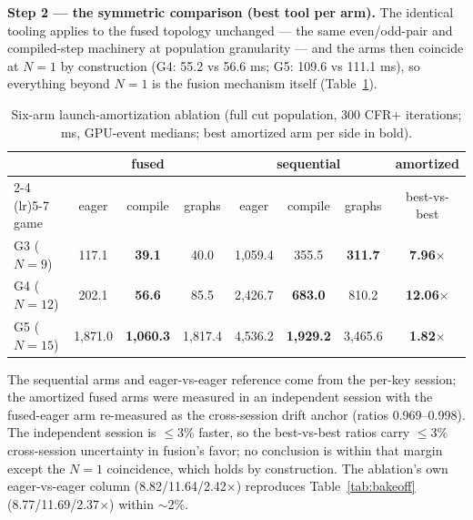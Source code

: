 \documentclass[11pt]{article}
\begin{document}
\textbf{Step 2 --- the symmetric comparison (best tool per arm).} The identical tooling
applies to the fused topology unchanged --- the same even/odd-pair and compiled-step
machinery at population granularity --- and the arms then coincide at $N{=}1$ by
construction (G4: 55.2 vs 56.6 ms; G5: 109.6 vs 111.1 ms), so everything beyond $N{=}1$
is the fusion mechanism itself (Table~\ref{tab:sixarm}).

\begin{table}[t]
\centering
\caption{Six-arm launch-amortization ablation (full cut population, 300 CFR+
iterations; ms, GPU-event medians; best amortized arm per side in bold).}
\label{tab:sixarm}
\begin{tabular}{lccccccc}
\toprule
 & \multicolumn{3}{c}{fused} & \multicolumn{3}{c}{sequential} & amortized \\
\cmidrule(lr){2-4} \cmidrule(lr){5-7}
game & eager & compile & graphs & eager & compile & graphs & best-vs-best \\
\midrule
G3 ($N{=}9$) & 117.1 & \textbf{39.1} & 40.0 & 1,059.4 & 355.5 & \textbf{311.7} & \textbf{7.96$\times$} \\
G4 ($N{=}12$) & 202.1 & \textbf{56.6} & 85.5 & 2,426.7 & \textbf{683.0} & 810.2 & \textbf{12.06$\times$} \\
G5 ($N{=}15$) & 1,871.0 & \textbf{1,060.3} & 1,817.4 & 4,536.2 & \textbf{1,929.2} & 3,465.6 & \textbf{1.82$\times$} \\
\bottomrule
\end{tabular}
\end{table}

The sequential arms and eager-vs-eager reference come from the per-key session; the
amortized fused arms were measured in an independent session with the fused-eager arm
re-measured as the cross-session drift anchor (ratios 0.969--0.998). The independent
session is $\le$3\% faster, so the best-vs-best ratios carry $\le$3\% cross-session
uncertainty in fusion's favor; no conclusion is within that margin except the $N{=}1$
coincidence, which holds by construction. The ablation's own eager-vs-eager column
(8.82/11.64/2.42$\times$) reproduces Table~\ref{tab:bakeoff}
(8.77/11.69/2.37$\times$) within $\sim$2\%.
\end{document}

